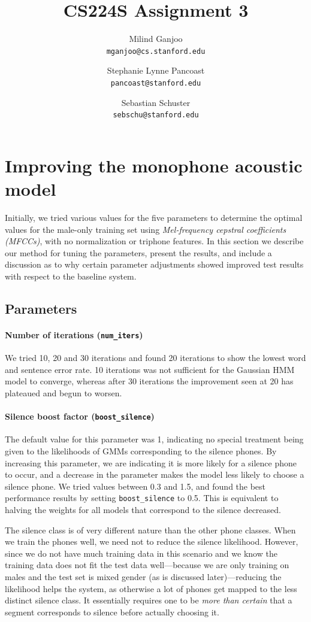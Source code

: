 \documentclass[twocolumn, 11pt]{article}
\title{CS224S Assignment 3}
\author{Milind Ganjoo\\\texttt{mganjoo@cs.stanford.edu}
\and%
Stephanie Lynne Pancoast\\\texttt{pancoast@stanford.edu}
\and%
Sebastian Schuster\\\texttt{sebschu@stanford.edu}}
\date{}
\begin{document}
\maketitle
{}
\section{Improving the monophone acoustic model}\label{sec:improved-mono}

Initially, we tried various values for the five parameters to determine the
optimal values for the male-only training set using \emph{Mel-frequency cepstral
coefficients (MFCCs)}, with no normalization or triphone features. In this
section we describe our method for tuning the parameters, present the results,
and include a discussion as to why certain parameter adjustments showed improved
test results with respect to the baseline system.

\subsection{Parameters}

\paragraph{Number of iterations (\texttt{num\_iters})} We tried 10, 20 and 30 iterations and found 20
iterations to show the lowest word and sentence error rate. 10 iterations was
not sufficient for the Gaussian HMM model to converge, whereas after 30
iterations the improvement seen at 20 has plateaued and begun to worsen.

\paragraph{Silence boost factor (\texttt{boost\_silence})} The default value for
this parameter was 1, indicating no special treatment being given to the
likelihoods of GMMs corresponding to the silence phones. By increasing this
parameter, we are indicating it is more likely for a silence phone to occur, and
a decrease in the parameter makes the model less likely to choose a silence
phone. We tried values between 0.3 and 1.5, and found the best performance
results by setting \texttt{boost\_silence} to 0.5. This is equivalent to halving
the weights for all models that correspond to the silence decreased.

The silence class is of very different nature than the other phone classes.
When we train the phones well, we need not to reduce the silence likelihood.
However, since we do not have much training data in this scenario and we know
the training data does not fit the test data well---because we are only training
on males and the test set is mixed gender (as is discussed later)---reducing the
likelihood helps the system, as otherwise a lot of phones get mapped to the less
distinct silence class. It essentially requires one to be \emph{more than
certain} that a segment corresponds to silence before actually choosing it.
\end{document}
